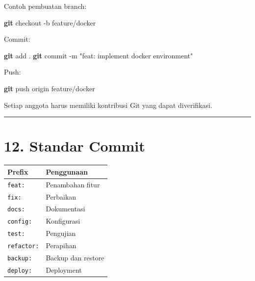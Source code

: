 \documentclass[
]{article}
\newenvironment{Shaded}{\begin{snugshade}}{\end{snugshade}}
\newcommand{\AttributeTok}[1]{\textcolor[rgb]{0.13,0.29,0.53}{#1}}
\newcommand{\FunctionTok}[1]{\textcolor[rgb]{0.13,0.29,0.53}{\textbf{#1}}}
\newcommand{\NormalTok}[1]{#1}
\newcommand{\StringTok}[1]{\textcolor[rgb]{0.31,0.60,0.02}{#1}}
\begin{document}
Contoh pembuatan branch:

\begin{Shaded}
\begin{Highlighting}[]
\FunctionTok{git}\NormalTok{ checkout }\AttributeTok{{-}b}\NormalTok{ feature/docker}
\end{Highlighting}
\end{Shaded}

Commit:

\begin{Shaded}
\begin{Highlighting}[]
\FunctionTok{git}\NormalTok{ add .}
\FunctionTok{git}\NormalTok{ commit }\AttributeTok{{-}m} \StringTok{"feat: implement docker environment"}
\end{Highlighting}
\end{Shaded}

Push:

\begin{Shaded}
\begin{Highlighting}[]
\FunctionTok{git}\NormalTok{ push origin feature/docker}
\end{Highlighting}
\end{Shaded}

Setiap anggota harus memiliki kontribusi Git yang dapat diverifikasi.

\begin{center}\rule{0.5\linewidth}{0.5pt}\end{center}

\section{12. Standar Commit}\label{standar-commit}

\begin{longtable}[]{@{}ll@{}}
\toprule\noalign{}
Prefix & Penggunaan \\
\midrule\noalign{}
\endhead
\bottomrule\noalign{}
\endlastfoot
\texttt{feat:} & Penambahan fitur \\
\texttt{fix:} & Perbaikan \\
\texttt{docs:} & Dokumentasi \\
\texttt{config:} & Konfigurasi \\
\texttt{test:} & Pengujian \\
\texttt{refactor:} & Perapihan \\
\texttt{backup:} & Backup dan restore \\
\texttt{deploy:} & Deployment \\
\end{longtable}
\end{document}
